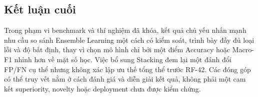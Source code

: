 \subsection{Kết luận cuối}
Trong phạm vi benchmark và thí nghiệm đã khóa, kết quả chủ yếu nhấn mạnh nhu cầu so sánh Ensemble Learning một cách có kiểm soát, trình bày đầy đủ loại lỗi và độ bất định, thay vì chọn mô hình chỉ bởi một điểm Accuracy hoặc Macro-F1 nhỉnh hơn về mặt số học. Việc bổ sung Stacking đem lại một đánh đổi FP/FN cụ thể nhưng không xác lập ưu thế tổng thể trước RF-42. Các đóng góp có thể truy vết nằm ở cách đánh giá và diễn giải kết quả, không phải một cam kết superiority, novelty hoặc deployment chưa được kiểm chứng.
